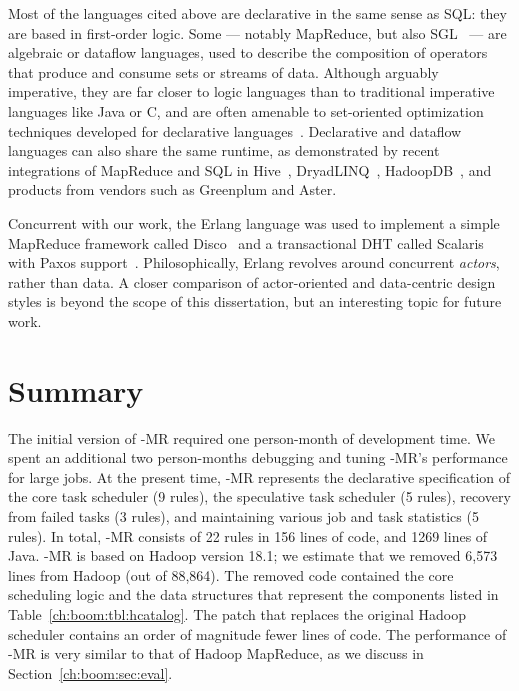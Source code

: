 Most of the languages cited above are declarative in the same sense as SQL: they are 
based in first-order logic. Some --- notably MapReduce, but also SGL~\cite{cornellgames} --- are
algebraic or dataflow languages, used to describe the composition of operators that produce and 
consume sets or streams of data.  Although arguably imperative, they are far closer to logic languages 
than to traditional imperative languages like Java or C, and are often amenable to set-oriented optimization 
techniques developed for declarative languages~\cite{cornellgames}. Declarative and dataflow languages 
can also share the same runtime, as demonstrated by recent integrations of MapReduce and SQL
in Hive~\cite{hive-vldb}, DryadLINQ~\cite{DryadLINQ}, HadoopDB~\cite{hadoopdb}, and products from vendors 
such as Greenplum and Aster.

Concurrent with our work, the Erlang language was used to implement a simple MapReduce framework called 
Disco~\cite{disco} and a transactional DHT called Scalaris with Paxos support~\cite{scalaris}. Philosophically, Erlang 
revolves around concurrent {\em actors}, rather than data. A closer comparison of actor-oriented and data-centric design 
styles is beyond the scope of this dissertation, but an interesting topic for future work.

\section{Summary}
\label{ch:boom:sec:conclusion}

The initial version of \BOOM-MR required one person-month of development time.
We spent an additional two person-months debugging and tuning \BOOM-MR's
performance for large jobs.  At the present time, \BOOM-MR represents the
declarative specification of the core task scheduler (9 rules), the speculative
task scheduler (5 rules), recovery from failed tasks (3 rules), and maintaining
various job and task statistics (5 rules).  In total, \BOOM-MR consists of 22
\OVERLOG rules in 156 lines of code, and 1269 lines of Java.  \BOOM-MR is based
on Hadoop version 18.1; we estimate that we removed 6,573 lines from Hadoop
(out of 88,864).  The removed code contained the core scheduling logic and the
data structures that represent the components listed in
Table~\ref{ch:boom:tbl:hcatalog}.  The \OVERLOG patch that replaces the
original Hadoop scheduler contains an order of magnitude fewer lines of code.
The performance of \BOOM-MR is very similar to that of Hadoop MapReduce, as we
discuss in Section~\ref{ch:boom:sec:eval}.

